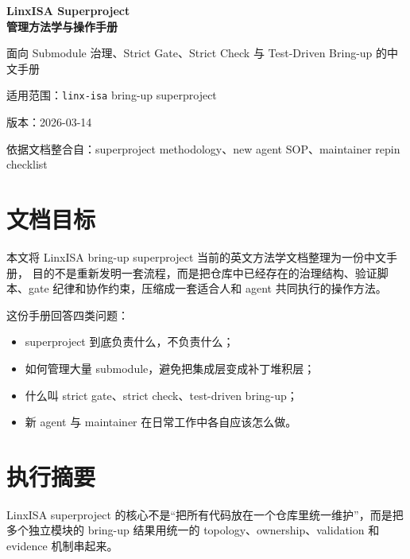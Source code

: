 \documentclass[UTF8,11pt,a4paper]{ctexart}
\begin{document}
\begin{titlepage}
  \centering
  \vspace*{3.2cm}
  {\Huge\bfseries LinxISA Superproject\\管理方法学与操作手册\par}
  \vspace{1.4cm}
  {\Large 面向 Submodule 治理、Strict Gate、Strict Check 与 Test-Driven Bring-up 的中文手册\par}
  \vspace{2.4cm}
  {\large 适用范围：\texttt{linx-isa} bring-up superproject\par}
  \vspace{0.6cm}
  {\large 版本：2026-03-14\par}
  \vfill
  {\large 依据文档整合自：superproject methodology、new agent SOP、maintainer repin checklist\par}
  \vspace{1.2cm}
\end{titlepage}

\tableofcontents
\newpage

\section{文档目标}

本文将 LinxISA bring-up superproject 当前的英文方法学文档整理为一份中文手册，
目的不是重新发明一套流程，而是把仓库中已经存在的治理结构、验证脚本、gate
纪律和协作约束，压缩成一套适合人和 agent 共同执行的操作方法。

这份手册回答四类问题：

\begin{itemize}
  \item superproject 到底负责什么，不负责什么；
  \item 如何管理大量 submodule，避免把集成层变成补丁堆积层；
  \item 什么叫 strict gate、strict check、test-driven bring-up；
  \item 新 agent 与 maintainer 在日常工作中各自应该怎么做。
\end{itemize}

\section{执行摘要}

LinxISA superproject 的核心不是“把所有代码放在一个仓库里统一维护”，而是把
多个独立模块的 bring-up 结果用统一的 topology、ownership、validation 和
evidence 机制串起来。
\end{document}
